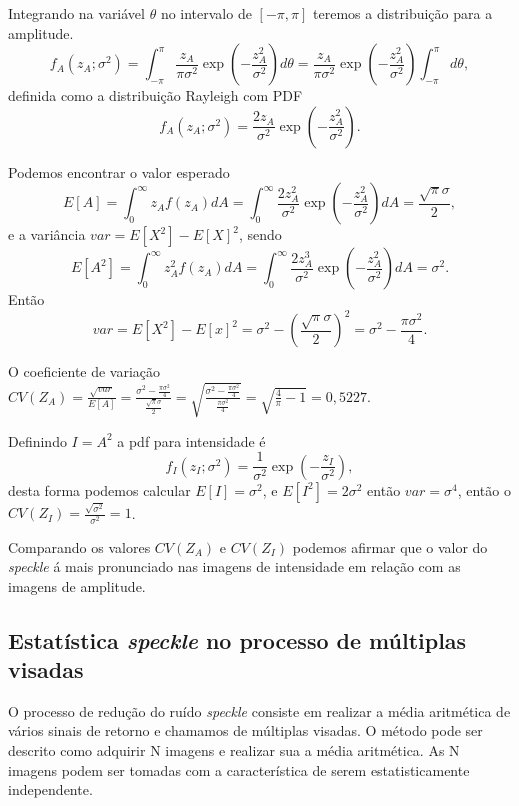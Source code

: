 Integrando na variável $\theta$ no intervalo de $[-\pi,\pi]$ teremos a distribuição para a amplitude.
\begin{equation}\nonumber
f_A(z_A;\sigma^2)=\int_{-\pi}^{\pi}\frac{z_A}{\pi\sigma^2}\exp\left(-\frac{z_A^2}{\sigma^2}\right)d\theta=\frac{z_A}{\pi\sigma^2}\exp\left(-\frac{z_A^2}{\sigma^2}\right)\int_{-\pi}^{\pi}d\theta,
\end{equation}
definida como a distribuição Rayleigh com PDF
\begin{equation}\nonumber
f_A(z_A;\sigma^2)=\frac{2z_A}{\sigma^2}\exp\left(-\frac{z_A^2}{\sigma^2}\right).
\end{equation}

Podemos encontrar o valor esperado $$E[A]=\int_0^\infty z_Af(z_A)dA=\int_0^	\infty \frac{2z_A^2}{\sigma^2}\exp\left(-\frac{z_A^2}{\sigma^2}\right) dA=\frac{\sqrt{\pi}\sigma}{2},$$ e a variância $var= E[X^2]-E[X]^2$, sendo $$E[A^2]=\int_0^\infty z_A^2f(z_A)dA=\int_0^	\infty \frac{2z_A^3}{\sigma^2}\exp\left(-\frac{z_A^2}{\sigma^2}\right) dA=\sigma^2.$$
Então $$var=E[X^2]-E[x]^2=\sigma^2-\left(\frac{\sqrt{\pi}\sigma}{2}\right)^2=\sigma^2-\frac{\pi\sigma^2}{4}.$$

O coeficiente de variação $CV(Z_A) =\frac{\sqrt{var}}{E[A]}=\frac{\sigma^2-\frac{\pi\sigma^2}{4}}{\frac{\sqrt{\pi}\sigma}{2}}=\sqrt{\frac{\sigma^2-\frac{\pi\sigma^2}{4}}{\frac{\pi\sigma^2}{4}}}=\sqrt{\frac{4}{\pi}-1}=0,5227.$

Definindo $I=A^2$ a pdf para intensidade é 
\begin{equation}\nonumber
f_I(z_I;\sigma^2)=\frac{1}{\sigma^2}\exp\left(-\frac{z_I}{\sigma^2}\right),
\end{equation}
desta forma podemos calcular $E[I]=\sigma^2$, e $E[I^2]=2\sigma^2$ então $var=\sigma^4$, então o $CV(Z_I)=\frac{\sqrt{\sigma^2}}{\sigma^2}=1$. 

Comparando os valores $CV(Z_A)$ e $CV(Z_I)$ podemos afirmar que o valor do \textit{speckle} á mais pronunciado nas imagens de intensidade em relação com as imagens de amplitude.

\subsection{Estatística \textit{speckle} no processo de múltiplas visadas}

O processo de redução do ruído \textit{speckle} consiste em realizar a média aritmética de vários sinais de retorno e chamamos de múltiplas visadas. O método pode ser descrito como adquirir N imagens e realizar sua a média aritmética. As N imagens podem ser tomadas com a característica de serem estatisticamente independente. 

